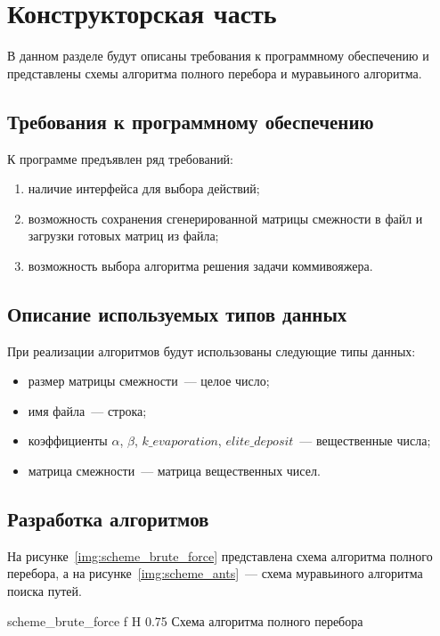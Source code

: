 \chapter{Конструкторская часть}

В данном разделе будут описаны требования к программному обеспечению и представлены схемы алгоритма полного перебора и муравьиного алгоритма.

\section{Требования к программному обеспечению}

К программе предъявлен ряд требований:
\begin{enumerate}
	\item наличие интерфейса для выбора действий;
	\item возможность сохранения сгенерированной матрицы смежности в файл и загрузки готовых матриц из файла;
	\item возможность выбора алгоритма решения задачи коммивояжера. 
\end{enumerate}

\section{Описание используемых типов данных}

При реализации алгоритмов будут использованы следующие типы данных:
\begin{itemize}
	\item размер матрицы смежности~--- целое число;
	\item имя файла~--- строка;
	\item коэффициенты $\alpha$, $\beta$, $k\_evaporation$, $elite\_deposit$~--- вещественные числа;
	\item матрица смежности~--- матрица вещественных чисел.
\end{itemize}

\section{Разработка алгоритмов}

На рисунке~\ref{img:scheme_brute_force} представлена схема алгоритма полного перебора, а на рисунке~\ref{img:scheme_ants}~--- схема муравьиного алгоритма поиска путей.

	{scheme_brute_force}
	{f}
	{H}
	{0.75\textwidth}
	{Схема алгоритма полного перебора}
	
